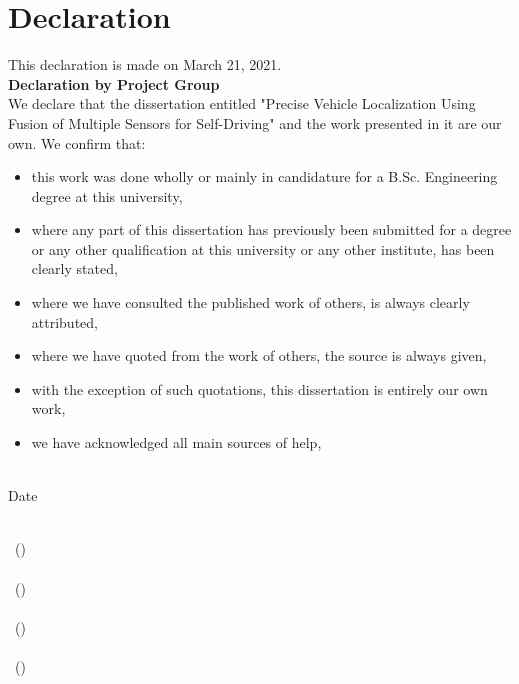 \chapter*{Declaration}


\begin{flushleft}
	This declaration is made on March 21, 2021. \\
	\vspace{10mm}
	\textbf{Declaration by Project Group} \\
	We declare that the dissertation entitled "Precise Vehicle Localization Using Fusion of Multiple Sensors for Self-Driving" and the work presented in it are our own. We confirm that:
	
	\begin{itemize}[noitemsep,topsep=0pt]
		\item this work was done wholly or mainly in candidature for a B.Sc. Engineering degree at this university,
		\item where any part of this dissertation has previously been submitted for a degree or any other qualification at this university or any other institute, has been clearly stated,
		\item where we have consulted the published work of others, is always clearly attributed,
		\item where we have quoted from the work of others, the source is always given,
		\item with the exception of such quotations, this dissertation is entirely our own work,
		\item we have acknowledged all main sources of help,
	\end{itemize}

\vspace{15mm}
\begin{multicols}{2}
	{\makebox[3cm]{\dotfill}} \\ 
	Date
	\vfill\null
	\columnbreak
	
	{\makebox[7cm]{\dotfill}} \\ 
	\memberA \  (\indexA)  \\
	\vspace{12mm}
	{\makebox[7cm]{\dotfill}} \\ 
	\memberB \ (\indexB)  \\
	\vspace{12mm}
	{\makebox[7cm]{\dotfill}} \\ 
	\memberC \ (\indexC)  \\
	\vspace{12mm}
	{\makebox[7cm]{\dotfill}} \\ 
	\memberD \ (\indexD)  \\

\end{multicols}


\end{flushleft}
